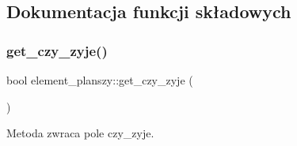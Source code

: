 \subsection{Dokumentacja funkcji składowych}
\mbox{\label{classelement__planszy_affcc7904f806550088b5362691b7953d}} 
\subsubsection{\texorpdfstring{get\+\_\+czy\+\_\+zyje()}{get\_czy\_zyje()}}
{\footnotesize\ttfamily bool element\+\_\+planszy\+::get\+\_\+czy\+\_\+zyje (\begin{DoxyParamCaption}{ }\end{DoxyParamCaption})}

Metoda zwraca pole czy\+\_\+zyje.

